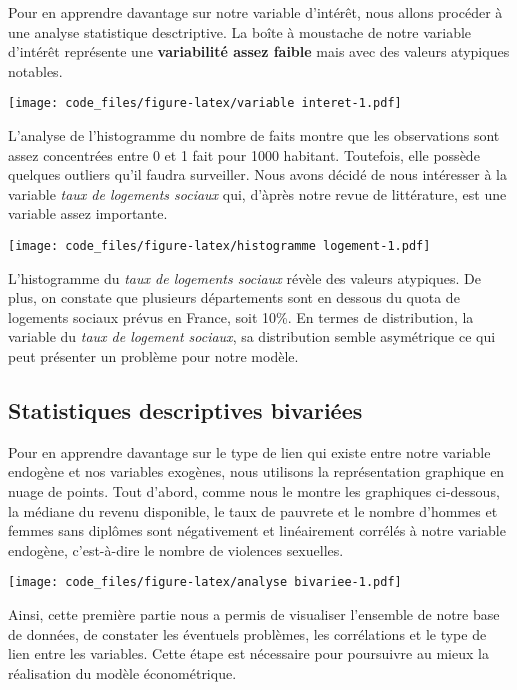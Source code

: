 \documentclass[
]{article}
\begin{document}
Pour en apprendre davantage sur notre variable d'intérêt, nous allons
procéder à une analyse statistique desctriptive. La boîte à moustache de
notre variable d'intérêt représente une \textbf{variabilité assez
faible} mais avec des valeurs atypiques notables.

\texttt{[image: code\_files/figure-latex/variable interet-1.pdf]}

L'analyse de l'histogramme du nombre de faits montre que les
observations sont assez concentrées entre 0 et 1 fait pour 1000
habitant. Toutefois, elle possède quelques outliers qu'il faudra
surveiller. Nous avons décidé de nous intéresser à la variable
\emph{taux de logements sociaux} qui, d'àprès notre revue de
littérature, est une variable assez importante.

\texttt{[image: code\_files/figure-latex/histogramme logement-1.pdf]}

L'histogramme du \emph{taux de logements sociaux} révèle des valeurs
atypiques. De plus, on constate que plusieurs départements sont en
dessous du quota de logements sociaux prévus en France, soit 10\%. En
termes de distribution, la variable du \emph{taux de logement sociaux},
sa distribution semble asymétrique ce qui peut présenter un problème
pour notre modèle.

\hypertarget{statistiques-descriptives-bivariuxe9es}{%
\subsection{Statistiques descriptives
bivariées}\label{statistiques-descriptives-bivariuxe9es}}

Pour en apprendre davantage sur le type de lien qui existe entre notre
variable endogène et nos variables exogènes, nous utilisons la
représentation graphique en nuage de points. Tout d'abord, comme nous le
montre les graphiques ci-dessous, la médiane du revenu disponible, le
taux de pauvrete et le nombre d'hommes et femmes sans diplômes sont
négativement et linéairement corrélés à notre variable endogène,
c'est-à-dire le nombre de violences sexuelles.

\texttt{[image: code\_files/figure-latex/analyse bivariee-1.pdf]}

Ainsi, cette première partie nous a permis de visualiser l'ensemble de
notre base de données, de constater les éventuels problèmes, les
corrélations et le type de lien entre les variables. Cette étape est
nécessaire pour poursuivre au mieux la réalisation du modèle
économétrique.
\end{document}
